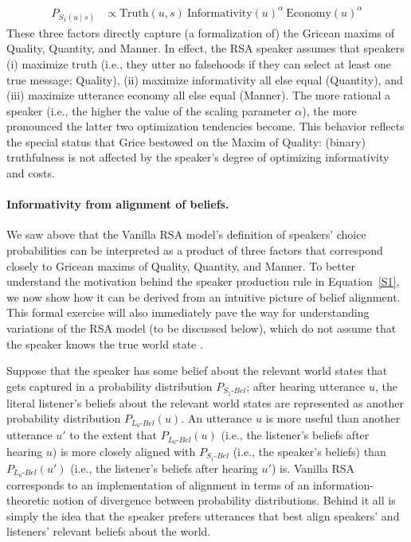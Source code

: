 \documentclass{sp}
\newcommand{\sem}[1]{\ensuremath{[\![#1]\!]}}
\begin{document}
\begin{align} \label{eq:S1-three-factor-formulation}
  P_{S_1(u\mid s)}   & \propto \text{Truth}(u,s) \ \text{Informativity}(u)^{\alpha} \ \text{Economy}(u)^{\alpha} %
\end{align}
These three factors directly capture (a formalization of) the Gricean maxims of Quality,
Quantity, and Manner. In effect, the RSA speaker assumes that speakers (i) maximize truth
(i.e., they utter no falsehoods if they can select at least one
true message; Quality), (ii) maximize informativity all else equal (Quantity), and (iii) maximize utterance
economy all else equal (Manner). The more rational a speaker (i.e., the higher the value of the scaling parameter $\alpha$), the more
pronounced the latter two optimization tendencies become. This behavior reflects the special
status that Grice bestowed on the Maxim of Quality: (binary) truthfulness is not affected by
the speaker's degree of optimizing informativity and costs.

\paragraph{Informativity from alignment of beliefs.} We saw above that the Vanilla RSA
model's definition of speakers' choice probabilities can be interpreted as a product of three
factors that correspond closely to Gricean maxims of Quality, Quantity, and Manner.
To better understand the motivation behind the speaker production rule in Equation~\eqref{S1}, we now show how it can be derived from an intuitive picture of belief alignment.
This formal exercise will also immediately pave the way for understanding variations of the RSA model (to be discussed below), which do not assume that the speaker knows the true world state \citep{goodmanstuhlmuller2013,scontrasgoodman2017,HerbstrittFranke2019:Complex-probabi}.

Suppose that the speaker has some belief about the relevant world states that gets captured in a probability distribution $P_{S_{1}\text{-}Bel}$;
after hearing utterance $u$, the literal listener's beliefs about the relevant world states are represented as another probability distribution $P_{L_{0}\text{-}Bel}(u)$.
An utterance $u$ is more useful than another utterance $u'$ to the extent that $P_{L_{0}\text{-}Bel}(u)$  (i.e., the listener's beliefs after hearing $u$) is more closely aligned with $P_{S_{1}\text{-}Bel}$ (i.e., the speaker's beliefs) than $P_{L_{0}\text{-}Bel}(u')$ (i.e., the listener's beliefs after hearing $u'$) is.
Vanilla RSA corresponds to an implementation of alignment in terms of an information-theoretic notion of divergence between probability distributions.
Behind it all is simply the idea that the speaker prefers utterances that best align speakers' and listeners' relevant beliefs about the world.
\end{document}
